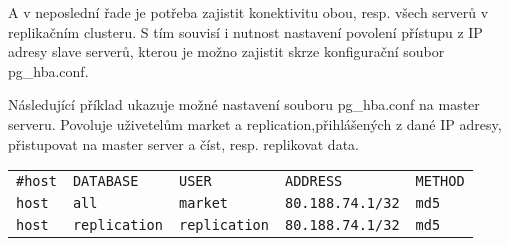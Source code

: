 A v neposlední řade je potřeba zajistit konektivitu obou, resp. všech serverů v replikačním clusteru. S tím souvisí i nutnost nastavení povolení přístupu z IP adresy slave serverů, kterou je možno zajistit skrze konfigurační soubor pg\_hba.conf.

Následující příklad ukazuje možné nastavení souboru pg\_hba.conf na master serveru. Povoluje uživetelům market a replication,přihlášených z dané IP adresy, přistupovat na master server a číst, resp. replikovat data.
      \begin{table}[H]
        \label{pgHba}
          \begin{center}
            \begin{tabular}{lllll}
              \texttt{\#host} & \texttt{DATABASE} & \texttt{USER} & \texttt{ADDRESS} & \texttt{METHOD} \\
                \texttt{host} & \texttt{all} & \texttt{market} & \texttt{80.188.74.1/32} & \texttt{md5} \\
       \texttt{host} & \texttt{replication} & \texttt{replication} & \texttt{80.188.74.1/32} &	\texttt{md5} \\
            \end{tabular}
          \end{center}
      \end{table}

